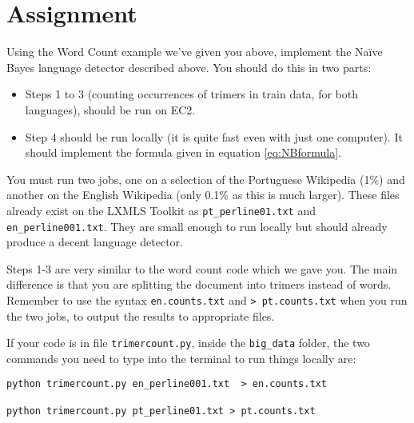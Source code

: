 \section{Assignment}

Using the Word Count example we've given you above, implement the Na\"{i}ve Bayes language detector described above. You should do this in two parts:

\begin{itemize}
	\item Steps 1 to 3 (counting occurrences of trimers in train data, for both languages), should be run on EC2. 
	\item Step 4 should be run locally (it is quite fast even with just one computer). It should implement the formula given in equation \eqref{eq:NBformula}.
\end{itemize}

%
%
%
%

You must run two jobs, one on a selection of the Portuguese Wikipedia (1\%) and
another on the English Wikipedia (only 0.1\% as this is much larger). These files already exist on the LXMLS Toolkit as \texttt{pt\_perline01.txt} and \texttt{en\_perline001.txt}. They are small enough to run locally but should already produce a decent language detector.

Steps 1-3 are very similar to the word count code which we gave you. The main difference is that you are splitting the document into trimers instead of words. Remember to use the syntax \texttt{en.counts.txt} and \texttt{> pt.counts.txt} when you run the two jobs, to output the results to appropriate files.

If your code is in file \texttt{trimercount.py}, inside the \texttt{big\_data} folder, the two commands you need to type into the terminal to run things locally are:

%
%

\begin{verbatim}
python trimercount.py en_perline001.txt  > en.counts.txt

python trimercount.py pt_perline01.txt > pt.counts.txt
\end{verbatim}

